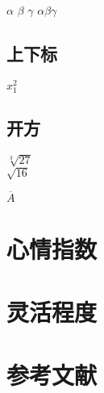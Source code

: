 \documentclass{ctexbook}
\begin{document}
	$ \alpha $
	$ \beta $
	$ \gamma $
	$ \alpha\beta\gamma $
	
	\section*{上下标}
	$ x^{2}_{1} $
	
	\section*{开方}
	$ \sqrt[3]{27} $\\$ \sqrt{16} $
	
	$ \overline{A} $
	
	
	\appendix
	\chapter{心情指数}
	\chapter{灵活程度}
	 
	 \backmatter
	 \chapter{参考文献}
	
\end{document}
